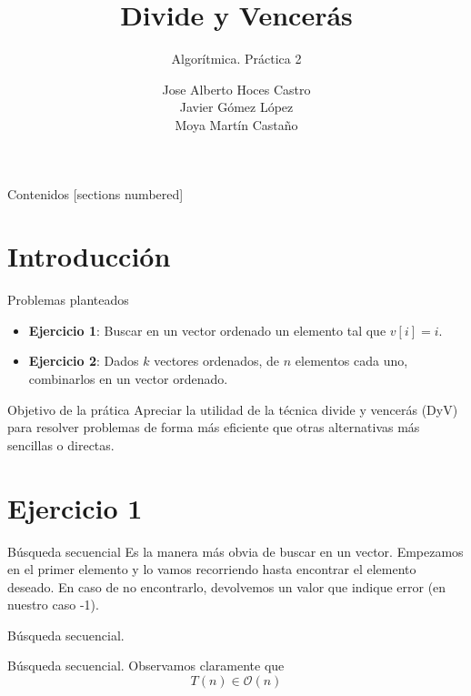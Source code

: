 \documentclass[10pt, xcolor=table]{beamer}
\title{Divide y Vencerás}
\subtitle{Algorítmica. \alert{Práctica 2}}
\date{}
\author{Jose Alberto Hoces Castro\\Javier Gómez López\\Moya Martín Castaño\\[4pt]}
\begin{document}
\maketitle

\begin{frame}{Contenidos}
	[sections numbered]
	\tableofcontents[]
\end{frame}

\section{Introducción}
\begin{frame}[fragile]{Problemas planteados}
	\begin{itemize}
		\item \textbf{Ejercicio 1}: Buscar en un vector ordenado un elemento tal que \(v[i] = i\).
		\item \textbf{Ejercicio 2}: Dados \(k\) vectores ordenados, de \(n\) elementos cada uno, combinarlos en un vector ordenado.
	\end{itemize}
\end{frame}

\begin{frame}[fragile]{Objetivo de la prática}
Apreciar la utilidad de la técnica divide y vencerás (DyV) para resolver problemas de forma más eficiente que otras alternativas más sencillas o directas.
\end{frame}

\section{Ejercicio 1}
\begin{frame}[fragile]{Búsqueda secuencial}
Es la manera más obvia de buscar en un vector. Empezamos en el primer elemento y lo vamos recorriendo hasta encontrar el elemento deseado. En caso de no encontrarlo, devolvemos un valor que indique error (en nuestro caso -1).
\end{frame}

\begin{frame}[fragile]{Búsqueda secuencial. }

\end{frame}

\begin{frame}[fragile]{Búsqueda secuencial. }
Observamos claramente que
\[
	T(n) \in \mathcal{O}(n)
\]
\end{frame}
\end{document}
